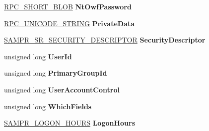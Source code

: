 \begin{DoxyCompactItemize}
\hyperlink{struct_r_p_c___s_h_o_r_t___b_l_o_b}{R\+P\+C\+\_\+\+S\+H\+O\+R\+T\+\_\+\+B\+L\+OB} {\bfseries Nt\+Owf\+Password}
\item 
\mbox{\label{struct___s_a_m_p_r___u_s_e_r___a_l_l___i_n_f_o_r_m_a_t_i_o_n_a73878b2831564b7d1e8b5b8d5ae69145}} 
\hyperlink{struct___r_p_c___u_n_i_c_o_d_e___s_t_r_i_n_g}{R\+P\+C\+\_\+\+U\+N\+I\+C\+O\+D\+E\+\_\+\+S\+T\+R\+I\+NG} {\bfseries Private\+Data}
\item 
\mbox{\label{struct___s_a_m_p_r___u_s_e_r___a_l_l___i_n_f_o_r_m_a_t_i_o_n_aafcfeedb9c45743a5a442680ad073aff}} 
\hyperlink{struct___s_a_m_p_r___s_r___s_e_c_u_r_i_t_y___d_e_s_c_r_i_p_t_o_r}{S\+A\+M\+P\+R\+\_\+\+S\+R\+\_\+\+S\+E\+C\+U\+R\+I\+T\+Y\+\_\+\+D\+E\+S\+C\+R\+I\+P\+T\+OR} {\bfseries Security\+Descriptor}
\item 
\mbox{\label{struct___s_a_m_p_r___u_s_e_r___a_l_l___i_n_f_o_r_m_a_t_i_o_n_aab34be380bd7b5f5e61ad7ccedb6ae14}} 
unsigned long {\bfseries User\+Id}
\item 
\mbox{\label{struct___s_a_m_p_r___u_s_e_r___a_l_l___i_n_f_o_r_m_a_t_i_o_n_a17863a36c0f111f0ab55865221f62e2e}} 
unsigned long {\bfseries Primary\+Group\+Id}
\item 
\mbox{\label{struct___s_a_m_p_r___u_s_e_r___a_l_l___i_n_f_o_r_m_a_t_i_o_n_ad889b8fae8a77c0caf73642521b3db7e}} 
unsigned long {\bfseries User\+Account\+Control}
\item 
\mbox{\label{struct___s_a_m_p_r___u_s_e_r___a_l_l___i_n_f_o_r_m_a_t_i_o_n_a3dcf29a2b51b57020e29a4fab42df759}} 
unsigned long {\bfseries Which\+Fields}
\item 
\mbox{\label{struct___s_a_m_p_r___u_s_e_r___a_l_l___i_n_f_o_r_m_a_t_i_o_n_a8350125e602c2c798a2874d13812c6ab}} 
\hyperlink{struct___s_a_m_p_r___l_o_g_o_n___h_o_u_r_s}{S\+A\+M\+P\+R\+\_\+\+L\+O\+G\+O\+N\+\_\+\+H\+O\+U\+RS} {\bfseries Logon\+Hours}

\end{DoxyCompactItemize}
